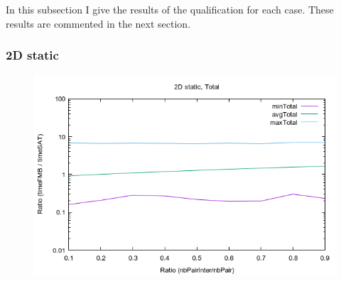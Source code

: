 \documentclass[12pt, a4paper]{article}
\begin{document}
In this subsection I give the results of the qualification for each case. These results are commented in the next section.\\

\subsubsection{2D static}

\begin{scriptsize}
\begin{ttfamily}

\end{ttfamily}
\end{scriptsize}

\begin{center}
\begin{figure}[H]
\centering\includegraphics[width=12cm]{../Results/qualification2D.png}\\
\end{figure}
\end{center}
\end{document}
